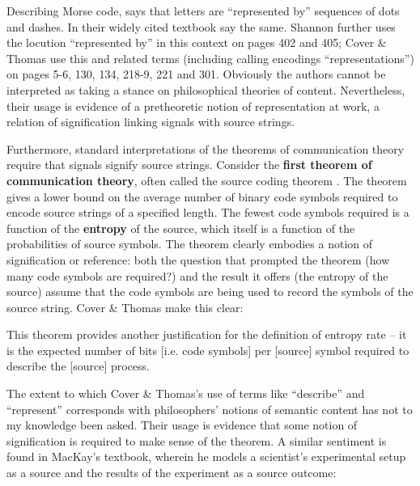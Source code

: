 \documentclass[12pt]{article}
\begin{document}
Describing Morse code, \citet[385]{shannon1948mathematicalc} says that letters are ``represented by'' sequences of dots and dashes.
In their widely cited textbook \citet[105]{cover2006elements} say the same.
Shannon further uses the locution ``represented by'' in this context on pages 402 and 405; Cover \& Thomas use this and related terms (including calling encodings ``representations'') on pages 5-6, 130, 134, 218-9, 221 and 301.
Obviously the authors cannot be interpreted as taking a stance on philosophical theories of content.
Nevertheless, their usage is evidence of a pretheoretic notion of representation at work, a relation of signification linking signals with source strings.

Furthermore, standard interpretations of the theorems of communication theory require that signals signify source strings.
Consider the \textbf{first theorem of communication theory}, often called the source coding theorem \citep[$\S$5]{cover2006elements} \citep[$\S$4]{mackay2003information}.
The theorem gives a lower bound on the average number of binary code symbols required to encode source strings of a specified length.
The fewest code symbols required is a function of the \textbf{entropy} of the source, which itself is a function of the probabilities of source symbols.
The theorem clearly embodies a notion of signification or reference: both the question that prompted the theorem (how many code symbols are required?) and the result it offers (the entropy of the source) assume that the code symbols are being used to record the symbols of the source string.
Cover \& Thomas make this clear:

\begin{myquote}
This theorem provides another justification for the definition of entropy rate -- it is the expected number of bits [i.e. code symbols] per [source] symbol required to describe the [source] process.
\par\hspace*{\fill}\citet[115]{cover2006elements}
\end{myquote}

\noindent The extent to which Cover \& Thomas's use of terms like ``describe'' and ``represent'' corresponds with philosophers' notions of semantic content has not to my knowledge been asked.
Their usage is evidence that some notion of signification is required to make sense of the theorem.
A similar sentiment is found in MacKay's textbook, wherein he models a scientist's experimental setup as a source and the results of the experiment as a source outcome:
\end{document}
